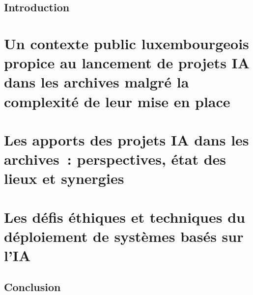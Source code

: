 \documentclass[a4paper,12pt,twoside]{book}
\begin{document}
	\chapter{Introduction}	
		
	\newpage{\pagestyle{empty}\cleardoublepage}
	
	\mainmatter

	
	\part{Un contexte public luxembourgeois propice au lancement de projets IA dans les archives malgré la complexité de leur mise en place}
		
		
			
		
	\part{Les apports des projets IA dans les archives :  perspectives, état des lieux et synergies}
			
			
			
			

	\part{Les défis éthiques et techniques du déploiement de systèmes basés sur l'IA}
			
			
			

	\chapter*{Conclusion}
			
	
	\newpage{\pagestyle{empty}\cleardoublepage}
	

		
	
	\appendix %
	
	
	\newpage{\pagestyle{empty}\cleardoublepage}
	
	
	\backmatter %
	\printglossaries
	\tableofcontents
\end{document}
